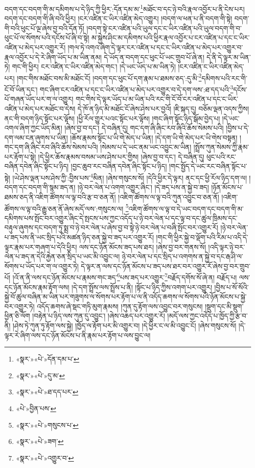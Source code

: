 བདག་དང་བདག་གི་མ་དམིགས་པ་དེ་ཉིད་ཀྱི་ཕྱིར་:དོན་དམ་མ་\footnote{«སྣར་»«པེ་»དོན་དམ་པ་}མཐོང་བ་དང་ཉེ་བའི་རྣལ་འབྱོར་པ་ནི་ངེས་པར། བདག་དང་བདག་གི་ཞི་བའི་ཕྱིར། །ངར་འཛིན་ང་ཡིར་འཛིན་མེད་འགྱུར། །བདག་ལ་ཕན་པ་ནི་བདག་གི་སྟེ། བདག་གི་བའི་ཕུང་པོ་ལྔ་ཞེས་བྱ་བའི་དོན་ཏོ། །བདག་སྟེ་ངར་འཛིན་པའི་ཡུལ་དང་ང་ཡིར་འཛིན་པའི་ཡུལ་བདག་གི་བ་ཕུང་པོ་ལ་སོགས་པའི་དངོས་པོ་ཞི་བ་སྟེ། མ་སྐྱེས་ཤིང་མ་དམིགས་པའི་ཕྱིར་རྣལ་འབྱོར་པ་ངར་འཛིན་པ་དང་ང་ཡིར་འཛིན་པ་མེད་པར་འགྱུར་རོ། །གལ་ཏེ་འགའ་ཞིག་དེ་ལྟར་ངར་འཛིན་པ་དང་ང་ཡིར་འཛིན་པ་མེད་པར་འགྱུར་བ་རྣལ་འབྱོར་པ་དེ་རེ་ཞིག་ཡོད་པ་མ་ཡིན་ནམ། དེ་ཡོད་ན་བདག་དང་ཕུང་པོ་ཡང་གྲུབ་པོ་ཞེ་ན། དེ་ནི་དེ་ལྟར་མ་ཡིན་ཏེ། གང་གི་ཕྱིར། ངར་འཛིན་ང་ཡིར་འཛིན་མེད་གང་། །དེ་ཡང་ཡོད་པ་མ་ཡིན་ཏེ། །ངར་འཛིན་ང་ཡིར་འཛིན་མེད་པར། །གང་གིས་མཐོང་བས་མི་མཐོང་ངོ། །བདག་དང་ཕུང་པོ་དག་རྣམ་པ་ཐམས་ཅད་:དུ་མི་\footnote{«སྣར་»«པེ་»དུ་མ་}དམིགས་པའི་རང་གི་ངོ་བོ་ཡིན་དང་། གང་ཞིག་ངར་འཛིན་པ་དང་ང་ཡིར་འཛིན་པ་མེད་པར་འགྱུར་བ་དེ་དག་ལས་:ཐ་དད་པའི་\footnote{«སྣར་»«པེ་»ཐ་དད་པར་}དངོས་པོ་གཞན་ཡོད་པར་ག་ལ་འགྱུར། གང་གིས་དེ་ལྟར་ཡོད་པ་མ་ཡིན་པའི་རང་གི་ངོ་བོ་ངར་འཛིན་པ་དང་ང་ཡིར་འཛིན་པ་མེད་པར་མཐོང་བ་དེས། དེ་ཁོ་ན་ཉིད་མི་མཐོང་ངོ་ཞེས་ཤེས་པར་བྱའོ། །ཇི་སྐད་དུ། བཅོམ་ལྡན་འདས་ཀྱིས། ནང་གི་བདག་ཉིད་སྟོང་པར་ལྟོས། །ཕྱི་རོལ་གྱུར་པའང་སྟོང་པར་ལྟོས། །གང་ཞིག་སྟོང་ཉིད་སྒོམ་བྱེད་པ། །དེ་ཡང་འགལ་ཞིག་ཀྱང་ཡོད་མིན། །ཞེས་བྱ་བ་དང་། དེ་བཞིན་དུ། གང་དག་ཞི་ཞིང་རབ་ཞིའི་ཆོས་སེམས་པའི། །བྱིས་པ་དེ་དག་ལམ་ངན་ཞུགས་པ་ཡིན། །ཆོས་རྣམས་སྟོང་པ་ཡི་གེ་མེད་པ་ཡིན། །དེ་དག་ཡི་གེ་མེད་པར་ཡི་གེས་བསྟན། །གང་དག་ཞི་ཞིང་རབ་ཞིའི་ཆོས་སེམས་པའི། །སེམས་པ་དེ་ཡང་ནམ་ཡང་འབྱུང་མ་ཡིན། །སྤྲོས་ཀུན་སེམས་ཀྱི་རྣམ་པར་རྟོག་པ་སྟེ། །དེ་ཕྱིར་ཆོས་རྣམས་བསམ་ཡས་ཤེས་པར་གྱིས། །ཞེས་བྱ་བ་དང་། དེ་བཞིན་དུ། ཕུང་པའི་རང་བཞིན་དབེན་ཞིང་སྟོང་པ་ཉིད། །བྱང་ཆུབ་རང་བཞིན་དབེན་ཞིང་སྟོང་པ་ཉིད། །གང་སྤྱོད་དེ་ཡང་རང་བཞིན་སྟོང་པ་སྟེ། །ཡེ་ཤེས་ལྡན་པས་ཤེས་ཀྱི་:བྱིས་པས་\footnote{«པེ་»བྱིན་པས་}མིན། །ཞེས་གསུངས་སོ། །དེའི་ཕྱིར་དེ་ལྟར། ནང་དང་ཕྱི་རོལ་ཉིད་དག་ལ། །བདག་དང་བདག་གི་སྙམ་ཟད་ན། །ཉེ་བར་ལེན་པ་འགག་འགྱུར་ཞིང་། །དེ་ཟད་པས་ན་སྐྱེ་བ་ཟད། །ཉོན་མོངས་པ་ཐམས་ཅད་ནི་འཇིག་ཚོགས་ལ་ལྟ་བའི་རྩ་བ་ཅན་ནོ། །འཇིག་ཚོགས་ལ་ལྟ་བའི་ཀུན་འབྱུང་བ་ཅན་ནོ། །འཇིག་ཚོགས་ལ་ལྟ་བའི་རྒྱུ་ཅན་ནོ་ཞེས་མདོ་ལས་:གསུངས་ལ། \footnote{«སྣར་»«པེ་»གསུངས་པ་}འཇིག་ཚོགས་ལ་ལྟ་བ་དེ་ཡང་བདག་དང་བདག་གི་མ་དམིགས་པས་སྤོང་བར་འགྱུར་ཞིང་དེ་སྤངས་པས་ཀྱང་འདོད་པ་ཉེ་བར་ལེན་པ་དང་ལྟ་བ་དང་ཚུལ་ཁྲིམས་དང་བརྟུལ་ཞུགས་དང་བདག་ཏུ་སྨྲ་བ་ཉེ་བར་ལེན་པ་ཞེས་བྱ་བ་སྟེ་ཉེ་བར་ལེན་པ་བཞི་སྤོང་བར་འགྱུར་རོ། །ཉེ་བར་ལེན་པ་ཟད་པས་ནི་ཡང་སྲིད་པའི་མཚན་ཉིད་ཅན་སྐྱེ་བ་ཟད་པར་འགྱུར་རོ། །གང་གི་ཕྱིར་སྐྱེ་བ་ལྡོག་པའི་རིམ་པ་འདི་དེ་ལྟར་རྣམ་པར་གཞག་པ་དེའི་ཕྱིར། ལས་དང་ཉོན་མོངས་ཟད་པས་ཐར། །ཞེས་བྱ་བར་གནས་སོ། །འདི་ལྟར་ཉེ་བར་ལེན་པ་ཟད་ན་དེའི་རྐྱེན་ཅན་སྲིད་པ་ཡང་མི་འབྱུང་ལ། ཉེ་བར་ལེན་པ་དང་སྲིད་པ་འགགས་ན་སྐྱེ་བ་དང་རྒ་ཤི་ལ་སོགས་པ་ཡོད་པར་ག་ལ་འགྱུར་ཏེ། དེ་ལྟར་ན་ལས་དང་ཉོན་མོངས་པ་ཟད་པས་ཐར་བར་འགྱུར་རོ་ཞེས་བྱ་བར་གྲུབ་པོ། །འོ་ན་ནི་ལས་དང་ཉོན་མོངས་པ་རྣམས་གང་ཟད་\footnote{«སྣར་»«པེ་»ཟག་}པས་ཟད་པར་འགྱུར་\footnote{«སྣར་»«པེ་»འགྱུར་བ་}བརྗོད་དགོས་སོ་ཞེ་ན། བརྗོད་པ། ལས་དང་ཉོན་མོངས་རྣམ་རྟོག་ལས། །དེ་དག་སྤྲོས་ལས་སྤྲོས་པ་ནི། །སྟོང་པ་ཉིད་ཀྱིས་འགག་པར་འགྱུར། །བྱིས་པ་སོ་སོའི་སྐྱེ་བོ་ཚུལ་བཞིན་མ་ཡིན་པར་གཟུགས་ལ་སོགས་པར་རྟོག་པ་ལ་ནི་འདོད་ཆགས་ལ་སོགས་པའི་ཉོན་མོངས་པ་སྐྱེ་བར་འགྱུར་ཏེ། འདོད་ཆགས་ཞེ་སྡང་གཏི་མུག་རྣམས། །ཀུན་དུ་རྟོག་ལས་འབྱུང་བར་གསུངས། །སྡུག་དང་མི་སྡུག་ཕྱིན་ཅི་ལོག །བརྟེན་པ་ཉིད་ལས་ཀུན་དུ་འབྱུང་། །ཞེས་འཆད་པར་འགྱུར་རོ། །མདོ་ལས་ཀྱང་འདོད་པ་ཁྱོད་ཀྱི་རྩ་བ་ནི། །ཤེས་ཏེ་ཀུན་ཏུ་རྟོག་ལས་སྐྱེ། །ཁྱོད་ལ་རྟོག་པར་མི་འགྱུར་བ། །དེ་ཕྱིར་ང་ལ་མི་འབྱུང་ངོ། །ཞེས་གསུངས་སོ། །དེ་ལྟར་རེ་ཞིག་ལས་དང་ཉོན་མོངས་པ་ནི་རྣམ་པར་རྟོག་པ་ལས་བྱུང་ལ། 